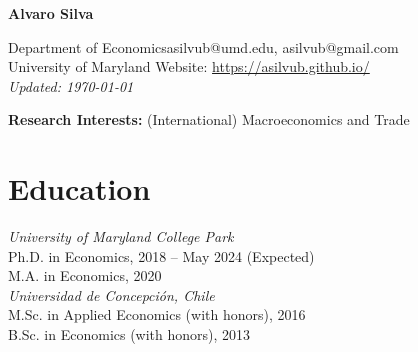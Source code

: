\documentclass[11pt]{article}
\begin{document}
\begin{center}
\begin{Large} \bfseries Alvaro Silva\end{Large}
\end{center}


\vspace*{0.2in}
Department of Economics\hfill asilvub@umd.edu, asilvub@gmail.com \\
University of Maryland \hfill Website: \href{https://asilvub.github.io/}{https://asilvub.github.io/} \\
\hfill \emph{Updated: \today}\\

\vspace*{-0.1in}


\textbf{\normalsize Research Interests: } (International) Macroeconomics and Trade

\section*{Education}
{\itshape University of Maryland College Park}\\
Ph.D. in Economics, 2018 --  May 2024 (Expected)\\
M.A. in Economics, 2020 \\[-0.1in]

{\itshape Universidad de Concepci\'on, Chile}\\
M.Sc. in Applied Economics (with honors), 2016 \\
B.Sc. in Economics (with honors), 2013

\end{document}
